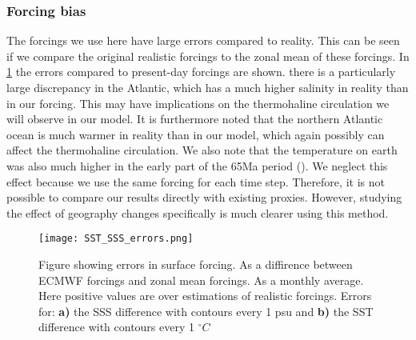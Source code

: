 \begin{multicols}{2}
 \subsubsection{Forcing bias} \label{sec:forc_err}
The forcings we use here have large errors compared to reality. This can be seen if we compare the original realistic forcings to the zonal mean of these forcings. In \cref{fig:sss_sst_errors} the errors compared to present-day forcings are shown. there is a particularly large discrepancy in the Atlantic, which has a much higher salinity in reality than in our forcing. This may have implications on the thermohaline circulation we will observe in our model. It is furthermore noted that the northern Atlantic ocean is much warmer in reality than in our model, which again possibly can affect the thermohaline circulation.
We also note that the temperature on earth was also much higher in the early part of the 65Ma period (\cite{Hansen2013Oct}). We neglect this effect because we use the same forcing for each time step. Therefore, it is not possible to compare our results directly with existing proxies. However, studying the effect of geography changes specifically is much clearer using this method.

\end{multicols}
\begin{figure}[H]
	\texttt{[image: SST\_SSS\_errors.png]}
	\caption{Figure showing errors in surface forcing. As a diffirence between ECMWF forcings and zonal mean forcings. As a monthly average. Here positive values are over estimations of realistic forcings. Errors for: \textbf{a)} the SSS difference with contours every 1 psu and \textbf{b)} the SST difference with contours every 1 $^{\circ}C$}
	\label{fig:sss_sst_errors}
\end{figure}
